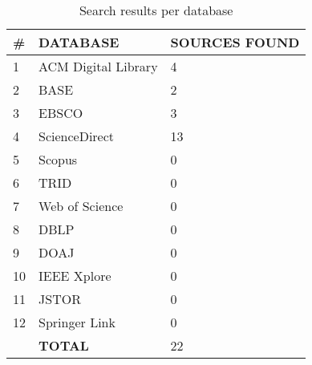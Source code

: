 \begin{table*}[h]
\begin{center}
\caption{Search results per database}
\small
\begin{tabular}{*{3}{l}}
\hline
\multicolumn{1}{l}{\#} & \textbf{DATABASE}                                     & \multicolumn{1}{l}{\textbf{SOURCES FOUND}} \\ \hline
1  & ACM Digital Library                      & 4 \\
2  & \acrfull{BASE}  & 2  \\
3  & EBSCO                                    & 3 \\
4  & ScienceDirect                            & 13 \\
5  & Scopus                                   & 0  \\
6                      & \acrfull{TRID} & 0                                          \\
7  & Web of Science                           & 0  \\
8                      & \acrfull{DBLP}        & 0                                          \\
9 & \acrfull{DOAJ} & 0  \\
10 & IEEE Xplore                              & 0  \\
11 & JSTOR                                    & 0  \\
12 & Springer Link                                         & 0                     \\ \hline
   & \textbf{TOTAL}                                        & 22                   \\ \hline
\end{tabular}
\label{table*:results}
\end{center}
\end{table*} 